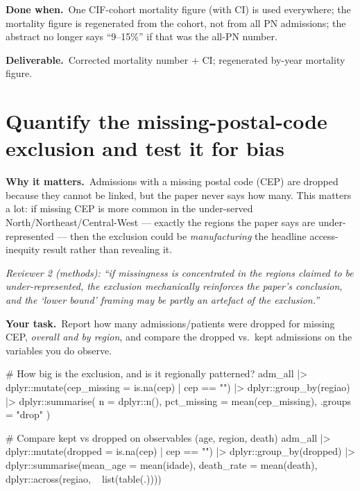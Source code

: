 \documentclass[11pt,a4paper]{article}
\newenvironment{reviewer}%
  {\def\FrameCommand{{\color{rulegray}\vrule width 1.5pt}\hspace{6pt}%
     \colorbox{quotebg}}%
   \MakeFramed{\advance\hsize-\width \FrameRestore}\small\itshape}%
  {\endMakeFramed}
\newcommand{\why}{\textbf{Why it matters.}\ }
\newcommand{\task}{\textbf{Your task.}\ }
\newcommand{\done}{\textbf{Done when.}\ }
\newcommand{\out}{\textbf{Deliverable.}\ }
\begin{document}

\done One CIF-cohort mortality figure (with CI) is used everywhere; the mortality figure is
regenerated from the cohort, not from all PN admissions; the abstract no longer says ``9--15\%''
if that was the all-PN number.

\out Corrected mortality number + CI; regenerated by-year mortality figure.

\section{Quantify the missing-postal-code exclusion and test it for bias}

\why Admissions with a missing postal code (CEP) are dropped because they cannot be linked, but
the paper never says how many. This matters a lot: if missing CEP is more common in the
under-served North/Northeast/Central-West --- exactly the regions the paper says are
under-represented --- then the exclusion could be \emph{manufacturing} the headline
access-inequity result rather than revealing it.

\begin{reviewer}
Reviewer 2 (methods): ``if missingness is concentrated in the regions claimed to be
under-represented, the exclusion mechanically reinforces the paper's conclusion, and the
`lower bound' framing may be partly an artefact of the exclusion.''
\end{reviewer}

\task Report how many admissions/patients were dropped for missing CEP, \emph{overall and by
region}, and compare the dropped vs.\ kept admissions on the variables you do observe.

\begin{Rcode}
# How big is the exclusion, and is it regionally patterned?
adm_all |>
  dplyr::mutate(cep_missing = is.na(cep) | cep == "") |>
  dplyr::group_by(regiao) |>
  dplyr::summarise(
    n            = dplyr::n(),
    pct_missing  = mean(cep_missing),
    .groups = "drop"
  )

# Compare kept vs dropped on observables (age, region, death)
adm_all |>
  dplyr::mutate(dropped = is.na(cep) | cep == "") |>
  dplyr::group_by(dropped) |>
  dplyr::summarise(mean_age = mean(idade), death_rate = mean(death),
                   dplyr::across(regiao, ~ list(table(.))))
\end{Rcode}
\end{document}
